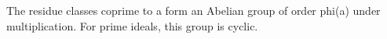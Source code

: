 The residue classes coprime to a form an Abelian group of order phi(a) under multiplication. For prime ideals, this group is cyclic.
